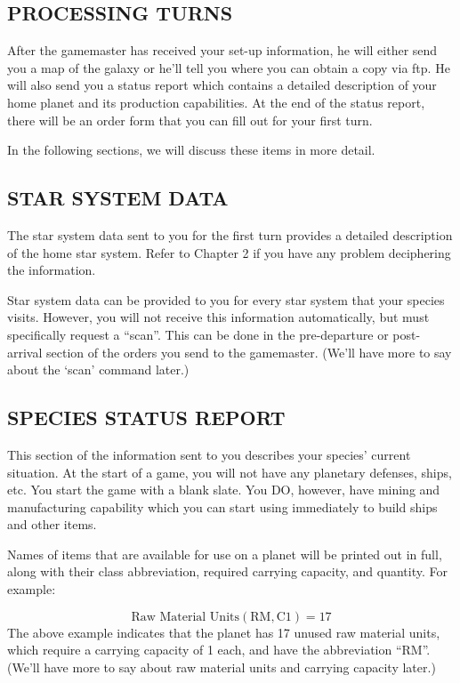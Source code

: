 \documentclass[10pt,titlepage]{article}
\begin{document}
\subsection{PROCESSING TURNS}
\label{sec:processingturns}

After the gamemaster has received your set-up information, he will either send
you a map of the galaxy or he'll tell you where you can obtain a copy via ftp.
He will also send you a status report which contains a detailed description of
your home planet and its production capabilities.  At the end of the status
report, there will be an order form that you can fill out for your first turn.

In the following sections, we will discuss these items in more detail.


\subsection{STAR SYSTEM DATA}
\label{sec:starsysdata}


The star system data sent to you for the first turn provides a detailed
description of the home star system.  Refer to Chapter 2 if you have any
problem deciphering the information.

Star system data can be provided to you for every star system that your species
visits.  However, you will not receive this information automatically, but must
specifically request a ``scan''.  This can be done in the pre-departure or post-
arrival section of the orders you send to the gamemaster.  (We'll have more to
say about the `scan' command later.)


\subsection{SPECIES STATUS REPORT}
\label{sec:speciesstatusreport}


This section of the information sent to you describes your species' current
situation.  At the start of a game, you will not have any planetary defenses,
ships, etc.  You start the game with a blank slate.  You DO, however, have
mining and manufacturing capability which you can start using immediately
to build ships and other items.

Names of items that are available for use on a planet will be printed out in
full, along with their class abbreviation, required carrying capacity, and
quantity.  For example:

\begin{equation*}
 \textrm{Raw Material Units}(\textrm{RM},\textrm{C1}) = 17
\end{equation*}
The above example indicates that the planet has 17 unused raw material units,
which require a carrying capacity of 1 each, and have the abbreviation ``RM''.
(We'll have more to say about raw material units and carrying capacity later.)
\end{document}
